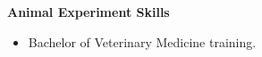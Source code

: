   
  



  

\textbf{Animal Experiment Skills}

\begin{itemize}
    \item Bachelor of Veterinary Medicine training.
\end{itemize}


